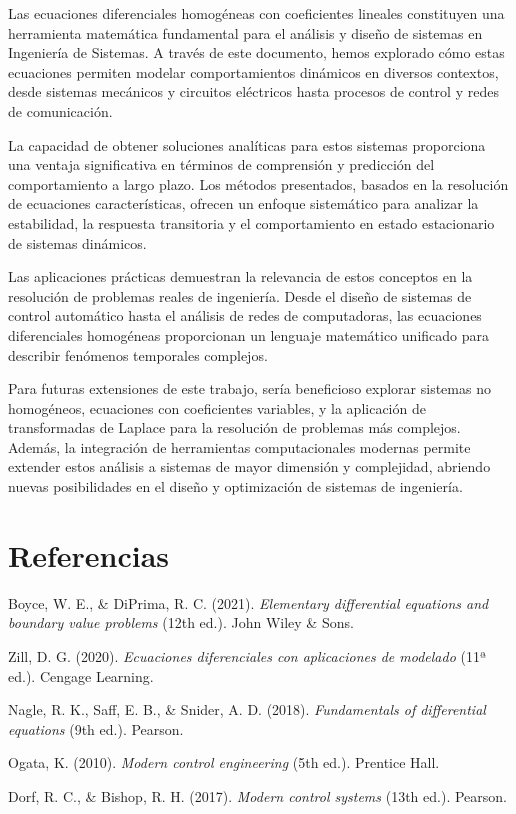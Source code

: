 \documentclass[12pt]{article}
\begin{document}
Las ecuaciones diferenciales homogéneas con coeficientes lineales constituyen una herramienta matemática fundamental para el análisis y diseño de sistemas en Ingeniería de Sistemas. A través de este documento, hemos explorado cómo estas ecuaciones permiten modelar comportamientos dinámicos en diversos contextos, desde sistemas mecánicos y circuitos eléctricos hasta procesos de control y redes de comunicación.

La capacidad de obtener soluciones analíticas para estos sistemas proporciona una ventaja significativa en términos de comprensión y predicción del comportamiento a largo plazo. Los métodos presentados, basados en la resolución de ecuaciones características, ofrecen un enfoque sistemático para analizar la estabilidad, la respuesta transitoria y el comportamiento en estado estacionario de sistemas dinámicos.

Las aplicaciones prácticas demuestran la relevancia de estos conceptos en la resolución de problemas reales de ingeniería. Desde el diseño de sistemas de control automático hasta el análisis de redes de computadoras, las ecuaciones diferenciales homogéneas proporcionan un lenguaje matemático unificado para describir fenómenos temporales complejos.

Para futuras extensiones de este trabajo, sería beneficioso explorar sistemas no homogéneos, ecuaciones con coeficientes variables, y la aplicación de transformadas de Laplace para la resolución de problemas más complejos. Además, la integración de herramientas computacionales modernas permite extender estos análisis a sistemas de mayor dimensión y complejidad, abriendo nuevas posibilidades en el diseño y optimización de sistemas de ingeniería.

\newpage

\section{Referencias}

\begin{thebibliography}{}

Boyce, W. E., \& DiPrima, R. C. (2021). \textit{Elementary differential equations and boundary value problems} (12th ed.). John Wiley \& Sons.

Zill, D. G. (2020). \textit{Ecuaciones diferenciales con aplicaciones de modelado} (11ª ed.). Cengage Learning.

Nagle, R. K., Saff, E. B., \& Snider, A. D. (2018). \textit{Fundamentals of differential equations} (9th ed.). Pearson.

Ogata, K. (2010). \textit{Modern control engineering} (5th ed.). Prentice Hall.

Dorf, R. C., \& Bishop, R. H. (2017). \textit{Modern control systems} (13th ed.). Pearson.

\end{thebibliography}
\end{document}
